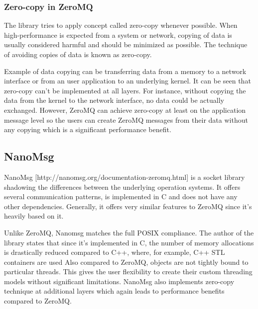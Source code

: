 \subsubsection{Zero-copy in ZeroMQ}
The library tries to apply concept called zero-copy whenever possible. When high-performance is expected from a system or network, copying of data is usually considered harmful and should be minimized as possible. The technique of avoiding copies of data is known as zero-copy.

Example of data copying can be transferring data from a memory to a network interface or from an user application to an underlying kernel. It can be seen that zero-copy can't be implemented at all layers. For instance, without copying the data from the kernel to the network interface, no data could be actually exchanged. However, ZeroMQ can achieve zero-copy at least on the application message level so the users can create ZeroMQ messages from their data without any copying which is a significant performance benefit.
\subsection{NanoMsg}
\label{nanomsg}
NanoMsg [http://nanomsg.org/documentation-zeromq.html] is a socket library shadowing the differences between the underlying operation systems. It offers several communication patterns, is implemented in C and does not have any other dependencies. Generally, it offers very similar features to ZeroMQ since it's heavily based on it.

Unlike ZeroMQ, Nanomsg matches the full POSIX compliance. The author of the library states that since it's implemented in C, the number of memory allocations is drastically reduced compared to C++, where, for example, C++ STL containers are used  Also compared to ZeroMQ, objects are not tightly bound to particular threads. This gives the user flexibility to create their custom threading models without significant limitations. NanoMsg also implements zero-copy technique at additional layers which again leads to performance benefits compared to ZeroMQ.

